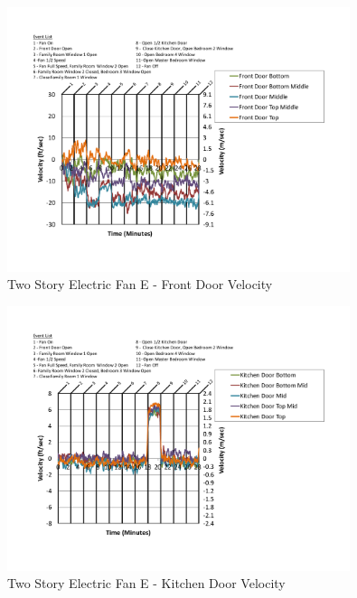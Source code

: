 \documentclass{article}
\begin{document}
\begin{appendices}
	\begin{figure}[H]
		\centering
		\includegraphics[height=3.05in,trim=0.67in 1.1in 0.67in 0.8in,clip=true]{0_Images/Results_Charts/ColdFlow/Two_Story/Electric/E/Front_Door_Velocity.pdf}
		\caption{Two Story Electric Fan E - Front Door Velocity}
	\end{figure}
 

	\begin{figure}[H]
		\centering
		\includegraphics[height=3.05in,trim=0.67in 1.1in 0.67in 0.8in,clip=true]{0_Images/Results_Charts/ColdFlow/Two_Story/Electric/E/Kitchen_Door_Velocity.pdf}
		\caption{Two Story Electric Fan E - Kitchen Door Velocity}
	\end{figure}
 
	\clearpage


\end{appendices}
\end{document}

